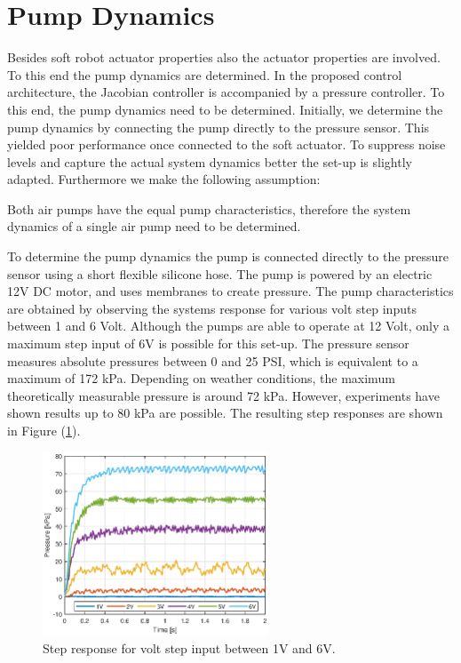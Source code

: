 \section{Pump Dynamics}





Besides soft robot actuator properties also the actuator properties are involved. To this end the pump dynamics are determined. In the proposed control architecture, the Jacobian controller is accompanied by a pressure controller. To this end, the pump dynamics need to be determined. Initially, we determine the pump dynamics by  connecting the pump directly to the pressure sensor. This yielded poor performance once connected to the soft actuator. To suppress noise levels and capture the actual system dynamics better the set-up is slightly adapted. Furthermore we make the following assumption:


\begin{theorem}
Both air pumps have the equal pump characteristics, therefore the system dynamics of a single air pump need to be determined.
\end{theorem}


To determine the pump dynamics the pump is connected directly to the pressure sensor using a short flexible silicone hose. The pump is powered by an electric 12V DC motor, and uses membranes to create pressure. The pump characteristics are obtained by observing the systems response for various volt step inputs between 1 and 6 Volt. Although the pumps are able to operate at 12 Volt, only a maximum step input of 6V is possible for this set-up. The pressure sensor measures absolute pressures between 0 and 25 PSI, which is equivalent to a maximum of 172 kPa. Depending on weather conditions, the maximum theoretically measurable pressure is around 72 kPa. However, experiments have shown results up to 80 kPa are possible. The resulting step responses are shown in Figure (\ref{fig1:pump_dynamcis}).

\begin{figure}[H]
    \centering
    \includegraphics[width = 0.6\textwidth]{Figures/Chapter3/stepresponsdirect16V.eps}
    \caption{Step response for volt step input between 1V and 6V.}
    \label{fig1:pump_dynamcis}
\end{figure}

